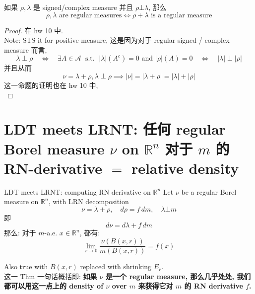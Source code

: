 \documentclass[lang=cn,11pt]{elegantbook}
\begin{document}
\begin{lemma}
    如果 $\rho, \lambda$ 是 signed/complex measure 并且 $\rho \bot \lambda$, 那么 \[
    \rho, \lambda \text{ are regular measures} \iff \rho + \lambda  \text{ is a regular measure}
    \]
\end{lemma}

\begin{proof}
在 hw 10 中.\\
Note:  STS it for positive measure, 这是因为对于 regular signed / complex measure 而言, \[ 
    \lambda \perp \rho \quad \iff \quad \exists A
    \in  \mathcal{A}\; \text{ s.t. } \; |\lambda|(A^c)=0\text{ and }|\rho|(A)=0  \quad \iff \quad |\lambda| \perp |\rho|
    \]
 并且从而     \[
\nu=\lambda+\rho ,   \lambda \perp \rho \implies |\nu|=|\lambda + \rho| = |\lambda|+|\rho|
\]
这一命题的证明也在 hw 10 中,\\
\end{proof}




\section{LDT meets LRNT: 任何 regular Borel measure $\nu$ on $\mathbb{R}^n$ 对于 $m$ 的 RN-derivative $=$ relative density}
\begin{theorem}{LDT meets LRNT: computing RN derivative on $\mathbb{R}^n$}
    Let $\nu$ be a regular Borel measure on $\mathbb{R}^n$, with LRN decomposition $$\nu = \lambda + \rho, \quad d\rho = f \, dm,\quad  \lambda \bot m$$即\[
    d\nu = d\lambda  + f\,dm
    \]
那么: 对于 $m$-a.e. $x\in \mathbb{R}^n$, 都有: \[
    \lim_{r \to 0} \frac{\nu(B(x,r))}{m(B(x,r))}  = f(x)
    \]
\end{theorem}
\begin{remark}
    Also true with $B(x,r)$ replaced with shrinking $E_r$.\\
    这一 Thm 一句话概括即: \textbf{如果 $\nu$ 是一个 regular measure, 那么几乎处处, 我们都可以用这一点上的 density of $\nu$ over $m$ 来获得它对 $m$ 的 RN derivative $f$.}
\end{remark}
\end{document}
